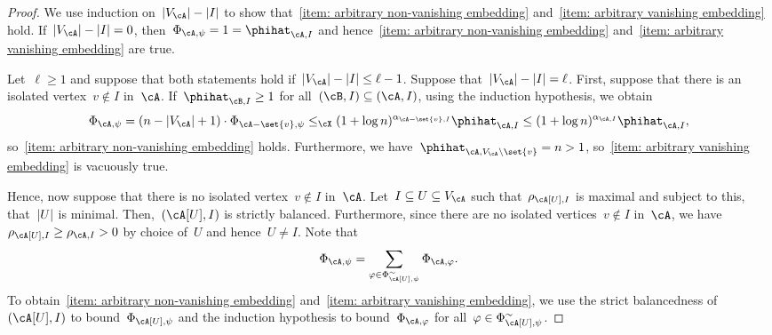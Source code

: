 \documentclass[11pt]{amsart}
\DeclarePairedDelimiter{\abs}{\lvert}{\rvert}
\newcommand{\Xleq}{\leq_{\cX}}
\def\phi{\varphi}
\theoremstyle{definition}
\numberwithin{equation}{section}
\begin{document}
	\begin{proof}
		We use induction on~$\abs{V_\cA}-\abs{I}$ to show that~\ref{item: arbitrary non-vanishing embedding} and~\ref{item: arbitrary vanishing embedding} hold.
		If~$\abs{V_\cA}-\abs{I}=0$, then~$\Phi_{\cA,\psi}=1=\phihat_{\cA,I}$ and hence~\ref{item: arbitrary non-vanishing embedding} and~\ref{item: arbitrary vanishing embedding} are true.
		
		Let~$\ell\geq 1$ and suppose that both statements hold if~$\abs{V_\cA}-\abs{I}\leq \ell-1$.
		Suppose that~$\abs{V_\cA}-\abs{I}=\ell$.
		First, suppose that there is an isolated vertex~$v\notin I$ in~$\cA$.
		If~$\phihat_{\cB,I}\geq 1$ for all~$(\cB,I)\subseteq (\cA,I)$, using the induction hypothesis, we obtain
		\begin{equation*}
			\Phi_{\cA,\psi}
			= (n-\abs{V_\cA}+1)\cdot  \Phi_{\cA-\set{v},\psi}
			\Xleq (1+\log n)^{\alpha_{\cA-\set{v},I}}\phihat_{\cA,I}
			\leq (1+\log n)^{\alpha_{\cA,I}}\phihat_{\cA,I},
		\end{equation*}
		so~\ref{item: arbitrary non-vanishing embedding} holds.
		Furthermore, we have~$\phihat_{\cA,V_\cA\setminus \set{v}}=n>1$, so~\ref{item: arbitrary vanishing embedding} is vacuously true.
		
		Hence, now suppose that there is no isolated vertex~$v\notin I$ in~$\cA$.
		Let~$I\subseteq U\subseteq V_\cA$ such that~$\rho_{\cA[U],I}$ is maximal and subject to this, that~$\abs{U}$ is minimal.
		Then,~$(\cA[U],I)$ is strictly balanced.
		Furthermore, since there are no isolated vertices~$v\notin I$ in~$\cA$, we have~$\rho_{\cA[U],I}\geq \rho_{\cA,I}>0$ by choice of~$U$ and hence~$U\neq I$.
		Note that
		\begin{equation}\label{equation: embedding in two steps}
			\Phi_{\cA,\psi}=\sum_{\phi\in \Phi_{\cA[U],\psi}^\sim} \Phi_{\cA,\phi}.
		\end{equation}
		To obtain~\ref{item: arbitrary non-vanishing embedding} and~\ref{item: arbitrary vanishing embedding}, we use the strict balancedness of~$(\cA[U],I)$ to bound~$\Phi_{\cA[U],\psi}$ and the induction hypothesis to bound~$\Phi_{\cA,\phi}$ for all~$\phi\in \Phi_{\cA[U],\psi}^\sim$.
		

\end{proof}
\end{document}
